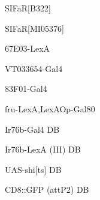 \documentclass[17pt]{extarticle}
\begin{document}
\begin{normalsize}
SIFaR[B322] \\[0.5em]
\end{normalsize}
\footnotesize
\newpage\vspace*{-0.15cm}
\begin{normalsize}
SIFaR[MI05376] \\[0.5em]
\end{normalsize}
\footnotesize
\newpage\vspace*{-0.15cm}
\begin{large}
67E03-LexA \\[0.5em]
\end{large}
\footnotesize
\newpage\vspace*{-0.15cm}
\begin{normalsize}
VT033654-Gal4 \\[0.5em]
\end{normalsize}
\footnotesize
\newpage\vspace*{-0.15cm}
\begin{large}
83F01-Gal4 \\[0.5em]
\end{large}
\footnotesize
\newpage\vspace*{-0.15cm}
\begin{footnotesize}
fru-LexA,LexAOp-Gal80 \\[0.5em]
\end{footnotesize}
\footnotesize
\newpage\vspace*{-0.15cm}
\begin{normalsize}
Ir76b-Gal4 DB \\[0.5em]
\end{normalsize}
\footnotesize
\newpage\vspace*{-0.15cm}
\begin{footnotesize}
Ir76b-LexA (III) DB \\[0.5em]
\end{footnotesize}
\footnotesize
\newpage\vspace*{-0.15cm}
\begin{normalsize}
UAS-shi[ts] DB \\[0.5em]
\end{normalsize}
\footnotesize
\newpage\vspace*{-0.15cm}
\begin{footnotesize}
CD8::GFP (attP2) DB \\[0.5em]
\end{footnotesize}
\footnotesize
\newpage\vspace*{-0.15cm}
\end{document}

